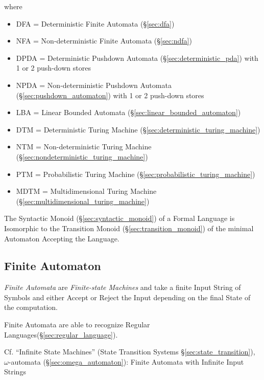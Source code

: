 where
\begin{itemize}
\item DFA = Deterministic Finite Automata (\S\ref{sec:dfa})
\item NFA = Non-deterministic Finite Automata (\S\ref{sec:ndfa})
\item DPDA = Deterministic Pushdown Automata
  (\S\ref{sec:deterministic_pda}) with 1 or 2 push-down stores
\item NPDA = Non-deterministic Pushdown Automata
  (\S\ref{sec:pushdown_automaton}) with 1 or 2 push-down stores
\item LBA = Linear Bounded Automata
  (\S\ref{sec:linear_bounded_automaton})
\item DTM = Deterministic Turing Machine
  (\S\ref{sec:deterministic_turing_machine})
\item NTM = Non-deterministic Turing Machine
  (\S\ref{sec:nondeterministic_turing_machine})
\item PTM = Probabilistic Turing Machine
  (\S\ref{sec:probabilistic_turing_machine})
\item MDTM = Multidimensional Turing Machine
  (\S\ref{sec:multidimensional_turing_machine})
\end{itemize}

The Syntactic Monoid (\S\ref{sec:syntactic_monoid}) of a Formal
Language is Isomorphic to the Transition Monoid
(\S\ref{sec:transition_monoid}) of the minimal Automaton Accepting the
Language.



\subsection{Finite Automaton}\label{sec:finite_automaton}

\emph{Finite Automata} are \emph{Finite-state Machines} and take a
finite Input String of Symbols and either Accept or Reject the Input
depending on the final State of the computation.

Finite Automata are able to recognize Regular
Languages(\S\ref{sec:regular_language}).

\fist Cf. ``Infinite State Machines'' (State Transition Systems
\S\ref{sec:state_transition}), $\omega$-automata
(\S\ref{sec:omega_automaton}): Finite Automata with Infinite Input
Strings



